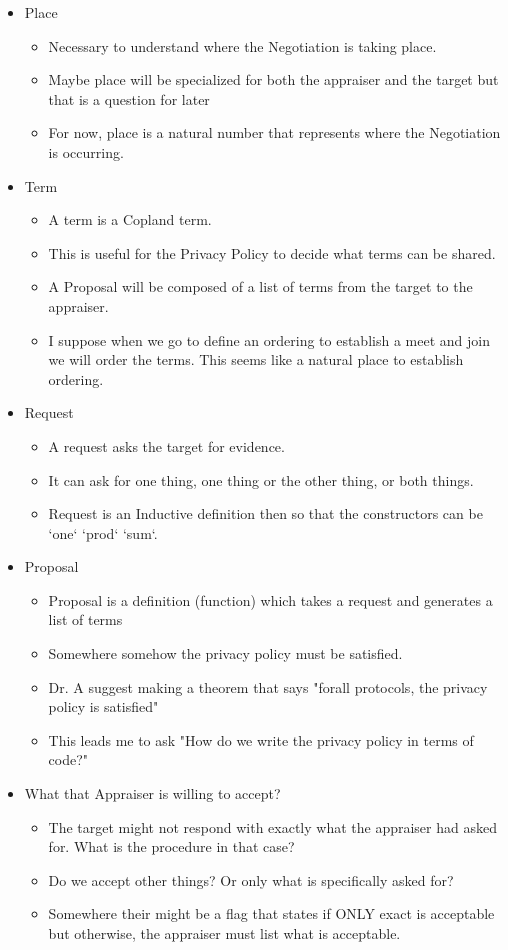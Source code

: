 \documentclass[10pt]{report}
\newcommand{\squash}{\itemsep=0pt\parskip=0pt}
\begin{document}
\begin{itemize}
\item Place
	\begin{itemize}
	\squash
	\item Necessary to understand where the Negotiation is taking place.
	\item Maybe place will be specialized for both the appraiser and the target but that is a question for later
	\item For now, place is a natural number that represents where the Negotiation is occurring.  
	\end{itemize}
\item Term
	\begin{itemize}
	\squash
	\item A term is a Copland term. 
	\item This is useful for the Privacy Policy to decide what terms can be shared. 
	\item A Proposal will be composed of a list of terms from the target to the appraiser.
	\item I suppose when we go to define an ordering to establish a meet and join we will order the terms. This seems like a natural place to establish ordering. 
	\end{itemize}
\item Request
	\begin{itemize}
	\item A request asks the target for evidence. 
	\item It can ask for one thing, one thing or the other thing, or both things. 
	\item Request is an Inductive definition then so that the constructors can be `one` `prod` `sum`.
	\end{itemize}
\item Proposal
	\begin{itemize}
	\item Proposal is a definition (function) which takes a request and generates a list of terms
	\item Somewhere somehow the privacy policy must be satisfied. 
	\item Dr. A suggest making a theorem that says "forall protocols, the privacy policy is satisfied"
	\item This leads me to ask "How do we write the privacy policy in terms of code?"
	\end{itemize}
\item What that Appraiser is willing to accept?
	\begin{itemize}
	\item The target might not respond with exactly what the appraiser had asked for. What is the procedure in that case?
	\item Do we accept other things? Or only what is specifically asked for?
	\item Somewhere their might be a flag that states if ONLY exact is acceptable but otherwise, the appraiser must list what is acceptable. 
	\end{itemize}

\end{itemize}
\end{document}

